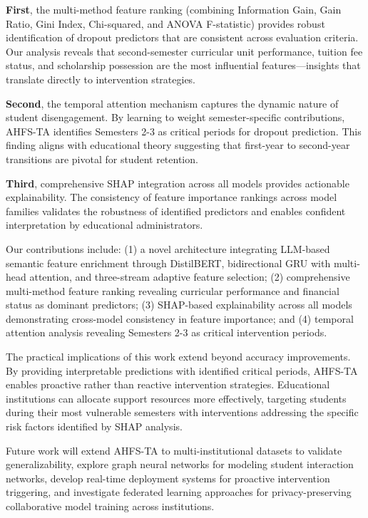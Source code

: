 \documentclass[journal]{IEEEtran}
\begin{document}
\textbf{First}, the multi-method feature ranking (combining Information Gain, Gain Ratio, Gini Index, Chi-squared, and ANOVA F-statistic) provides robust identification of dropout predictors that are consistent across evaluation criteria. Our analysis reveals that second-semester curricular unit performance, tuition fee status, and scholarship possession are the most influential features---insights that translate directly to intervention strategies.

\textbf{Second}, the temporal attention mechanism captures the dynamic nature of student disengagement. By learning to weight semester-specific contributions, AHFS-TA identifies Semesters 2-3 as critical periods for dropout prediction. This finding aligns with educational theory suggesting that first-year to second-year transitions are pivotal for student retention.

\textbf{Third}, comprehensive SHAP integration across all models provides actionable explainability. The consistency of feature importance rankings across model families validates the robustness of identified predictors and enables confident interpretation by educational administrators.

Our contributions include: (1) a novel architecture integrating LLM-based semantic feature enrichment through DistilBERT, bidirectional GRU with multi-head attention, and three-stream adaptive feature selection; (2) comprehensive multi-method feature ranking revealing curricular performance and financial status as dominant predictors; (3) SHAP-based explainability across all models demonstrating cross-model consistency in feature importance; and (4) temporal attention analysis revealing Semesters 2-3 as critical intervention periods.

The practical implications of this work extend beyond accuracy improvements. By providing interpretable predictions with identified critical periods, AHFS-TA enables proactive rather than reactive intervention strategies. Educational institutions can allocate support resources more effectively, targeting students during their most vulnerable semesters with interventions addressing the specific risk factors identified by SHAP analysis.

Future work will extend AHFS-TA to multi-institutional datasets to validate generalizability, explore graph neural networks for modeling student interaction networks, develop real-time deployment systems for proactive intervention triggering, and investigate federated learning approaches for privacy-preserving collaborative model training across institutions.
\end{document}
